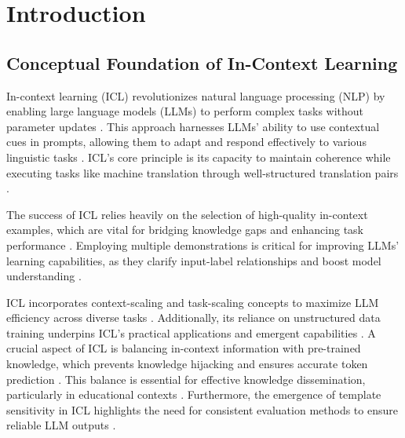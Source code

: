\section{Introduction} \label{sec:Introduction}



\subsection{Conceptual Foundation of In-Context Learning} \label{subsec:Conceptual Foundation of In-Context Learning}

In-context learning (ICL) revolutionizes natural language processing (NLP) by enabling large language models (LLMs) to perform complex tasks without parameter updates \cite{moradi2024exploringlandscapelargelanguage}. This approach harnesses LLMs' ability to use contextual cues in prompts, allowing them to adapt and respond effectively to various linguistic tasks \cite{kang2024incontextlearningnoisylabels}. ICL's core principle is its capacity to maintain coherence while executing tasks like machine translation through well-structured translation pairs \cite{sia2023incontextlearningmaintainingcoherency}.

The success of ICL relies heavily on the selection of high-quality in-context examples, which are vital for bridging knowledge gaps and enhancing task performance \cite{ye2023compositionalexemplarsincontextlearning}. Employing multiple demonstrations is critical for improving LLMs' learning capabilities, as they clarify input-label relationships and boost model understanding \cite{min2022rethinkingroledemonstrationsmakes,kossen2024incontextlearninglearnslabel}. 

ICL incorporates context-scaling and task-scaling concepts to maximize LLM efficiency across diverse tasks \cite{abedsoltan2024contextscalingversustaskscalingincontext}. Additionally, its reliance on unstructured data training underpins ICL's practical applications and emergent capabilities \cite{wibisono2024unstructureddataincontextlearning}. A crucial aspect of ICL is balancing in-context information with pre-trained knowledge, which prevents knowledge hijacking and ensures accurate token prediction \cite{wang2024understandingknowledgehijackmechanism}. This balance is essential for effective knowledge dissemination, particularly in educational contexts \cite{zhou2023conanovelcontextawareinstruction}. Furthermore, the emergence of template sensitivity in ICL highlights the need for consistent evaluation methods to ensure reliable LLM outputs \cite{voronov2024mindformatconsistentevaluation}.

